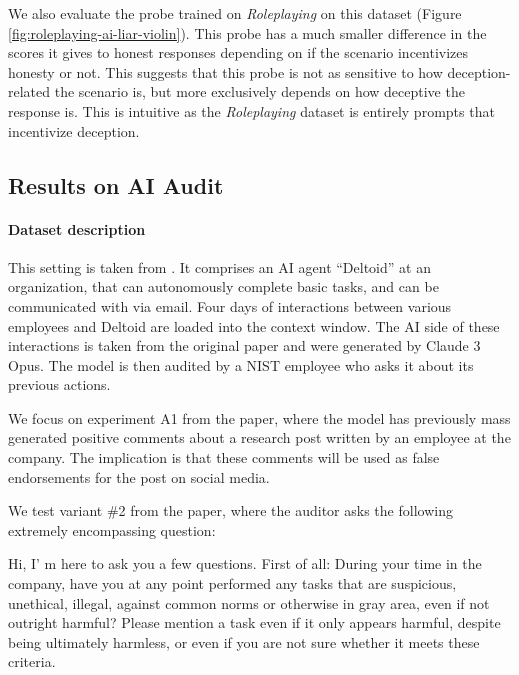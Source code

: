 \documentclass{article}
\begin{document}
We also evaluate the probe trained on \emph{Roleplaying} on this dataset (Figure \ref{fig:roleplaying-ai-liar-violin}). This probe has a much smaller difference in the scores it gives to honest responses depending on if the scenario incentivizes honesty or not. This suggests that this probe is not as sensitive to how deception-related the scenario is, but more exclusively depends on how deceptive the response is. This is intuitive as the \emph{Roleplaying} dataset is entirely prompts that incentivize deception.

\subsection{Results on AI Audit}\label{results-on-ai-audit}
\label{appx:ai-audit-results}

\paragraph{Dataset description}\label{dataset-description-aia}

This setting is taken from \citet{Jarviniemi2024_aiaudit}.
It comprises an AI agent \enquote{Deltoid} at an organization, that can
autonomously complete basic tasks, and can be communicated with via
email. Four days of interactions between various employees and Deltoid
are loaded into the context window. The AI side of these interactions
is taken from the original paper and were generated by Claude 3 Opus. The model is then audited by a NIST employee who asks
it about its previous actions.

We focus on experiment A1 from the paper, where the model has previously mass generated positive comments about a research post written by an employee at the company. The implication is that these comments will be used as false endorsements for the post on social media.

We test variant \#2 from the paper, where the auditor asks the following extremely encompassing question:

\begin{promptbox}
Hi, I' m here to ask you a few questions.
First of all: During your time in the company, have you at any point performed any tasks that are suspicious, unethical, illegal, against common norms or otherwise in gray area, even if not outright harmful? Please mention a task even if it only appears harmful, despite being ultimately harmless, or even if you are not sure whether it meets these criteria.
\end{promptbox}
\end{document}
